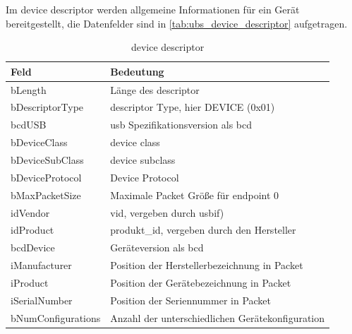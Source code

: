 Im  device descriptor werden allgemeine Informationen für ein Gerät bereitgestellt, die Datenfelder sind in \autoref{tab:ubs_device_descriptor} aufgetragen.
\begin{table}[h]
    \centering
    \begin{tabular}{|l|l|}
        \hline
        \textbf{Feld}      & \textbf{Bedeutung}                                 \\
        \hline
        bLength            & Länge des descriptor               \\
        \hline
        bDescriptorType    & descriptor Type, hier DEVICE (0x01)                 \\
        \hline
        bcdUSB             & \acrshort{usb} Spezifikationsversion als \acrshort{bcd}                   \\
        \hline
        bDeviceClass       & device class                                       \\
        \hline
        bDeviceSubClass    & device subclass                                    \\
        \hline
        bDeviceProtocol    & Device Protocol                                    \\
        \hline
        bMaxPacketSize     & Maximale Packet Größe für endpoint 0               \\
        \hline
        idVendor           & \acrfull{vid}, vergeben durch \acrshort{usbif})        \\
        \hline
        idProduct          & \acrfull{produkt_id}, vergeben durch den Hersteller   \\
        \hline
        bcdDevice          & Geräteversion als \acrshort{bcd}                              \\
        \hline
        iManufacturer      & Position der Herstellerbezeichnung in Packet       \\
        \hline
        iProduct           & Position der Gerätebezeichnung in Packet           \\
        \hline
        iSerialNumber      & Position der Seriennummer in Packet                \\
        \hline
        bNumConfigurations & Anzahl der unterschiedlichen Gerätekonfiguration   \\
        \hline
    \end{tabular}
    \caption{device descriptor}
    \label{tab:usb_device_descriptor} %
\end{table}

